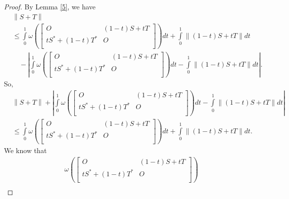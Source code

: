 \documentclass[12pt,twoside,reqno]{amsart}
\numberwithin{equation}{section}
\begin{document}
\begin{proof}
By Lemma \ref{5}, we have
\[\begin{aligned}
  & \left\| S+T \right\| \\ 
 & \le \int\limits_{0}^{1}{\omega \left( \left[ \begin{matrix}
   O & \left( 1-t \right)S+tT  \\
   t{{S}^{*}}+\left( 1-t \right){{T}^{*}} & O  \\
\end{matrix} \right] \right)dt}+\int\limits_{0}^{1}{\left\| \left( 1-t \right)S+tT \right\|dt} \\ 
 &\quad -\left| \int\limits_{0}^{1}{\omega \left( \left[ \begin{matrix}
   O & \left( 1-t \right)S+tT  \\
   t{{S}^{*}}+\left( 1-t \right){{T}^{*}} & O  \\
\end{matrix} \right] \right)dt}-\int\limits_{0}^{1}{\left\| \left( 1-t \right)S+tT \right\|dt} \right|.
\end{aligned}\]
So,
\begin{equation}\label{7}
\begin{aligned}
  & \left\| S+T \right\|+\left| \int\limits_{0}^{1}{\omega \left( \left[ \begin{matrix}
   O & \left( 1-t \right)S+tT  \\
   t{{S}^{*}}+\left( 1-t \right){{T}^{*}} & O  \\
\end{matrix} \right] \right)dt}-\int\limits_{0}^{1}{\left\| \left( 1-t \right)S+tT \right\|dt} \right| \\ 
 & \le \int\limits_{0}^{1}{\omega \left( \left[ \begin{matrix}
   O & \left( 1-t \right)S+tT  \\
   t{{S}^{*}}+\left( 1-t \right){{T}^{*}} & O  \\
\end{matrix} \right] \right)dt}+\int\limits_{0}^{1}{\left\| \left( 1-t \right)S+tT \right\|dt}. 
\end{aligned}
\end{equation}
We know that
\[\begin{aligned}
  & \omega \left( \left[ \begin{matrix}
   O & \left( 1-t \right)S+tT  \\
   t{{S}^{*}}+\left( 1-t \right){{T}^{*}} & O  \\
\end{matrix} \right] \right) \\ 

\end{aligned}\]
\end{proof}
\end{document}
